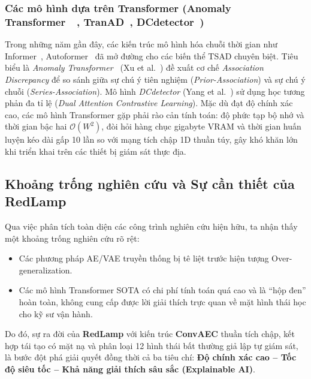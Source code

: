 \documentclass[11pt,journal,onecolumn]{IEEEtran}
\begin{document}
\subsubsection{Các mô hình dựa trên Transformer (Anomaly Transformer~\cite{xu2022anomaly}~\cite{xu2022anomaly}, TranAD~\cite{tuli2022tranad}, DCdetector~\cite{yang2023dcdetector})}
Trong những năm gần đây, các kiến trúc mô hình hóa chuỗi thời gian như Informer~\cite{zhou2021informer}, Autoformer~\cite{wu2021autoformer} đã mở đường cho các biến thể TSAD chuyên biệt. Tiêu biểu là \textit{Anomaly Transformer~\cite{xu2022anomaly}} (Xu et al.~\cite{xu2022anomaly}) đề xuất cơ chế \textit{Association Discrepancy} để so sánh giữa sự chú ý tiên nghiệm (\textit{Prior-Association}) và sự chú ý chuỗi (\textit{Series-Association}). Mô hình \textit{DCdetector} (Yang et al.~\cite{yang2023dcdetector}) sử dụng học tương phản đa tỉ lệ (\textit{Dual Attention Contrastive Learning}).
Mặc dù đạt độ chính xác cao, các mô hình Transformer gặp phải rào cản tính toán: độ phức tạp bộ nhớ và thời gian bậc hai $\mathcal{O}(W^2)$, đòi hỏi hàng chục gigabyte VRAM và thời gian huấn luyện kéo dài gấp 10 lần so với mạng tích chập 1D thuần túy, gây khó khăn lớn khi triển khai trên các thiết bị giám sát thực địa.

\subsection{Khoảng trống nghiên cứu và Sự cần thiết của RedLamp}
Qua việc phân tích toàn diện các công trình nghiên cứu hiện hữu, ta nhận thấy một khoảng trống nghiên cứu rõ rệt:
\begin{itemize}
    \item Các phương pháp AE/VAE truyền thống bị tê liệt trước hiện tượng Over-generalization.
    \item Các mô hình Transformer SOTA có chi phí tính toán quá cao và là ``hộp đen'' hoàn toàn, không cung cấp được lời giải thích trực quan về mặt hình thái học cho kỹ sư vận hành.
\end{itemize}
Do đó, sự ra đời của \textbf{RedLamp} với kiến trúc \textbf{ConvAEC} thuần tích chập, kết hợp tái tạo có mặt nạ và phân loại 12 hình thái bất thường giả lập tự giám sát, là bước đột phá giải quyết đồng thời cả ba tiêu chí: \textbf{Độ chính xác cao -- Tốc độ siêu tốc -- Khả năng giải thích sâu sắc (Explainable AI)}.



\end{document}
